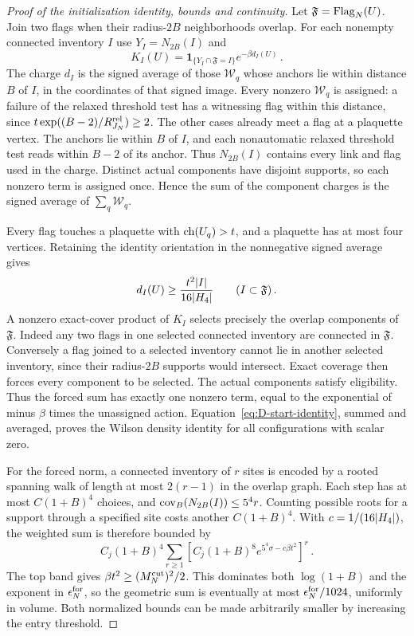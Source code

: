 \begin{proof}[Proof of the initialization identity, bounds and continuity]
Let $\mathfrak F=\operatorname{Flag}_N(U)$. Join two flags when their radius-$2B$ neighborhoods overlap. For each nonempty connected inventory $I$ use $Y_I=N_{2B}(I)$ and
\begin{equation*}
K_I(U)=\mathbf1_{\{Y_I\cap \mathfrak F=I\}}e^{-\beta d_I(U)}\,.
\end{equation*}
The charge $d_I$ is the signed average of those $\mathcal W_q$ whose anchors lie within distance $B$ of $I$, in the coordinates of that signed image. Every nonzero $\mathcal W_q$ is assigned: a failure of the relaxed threshold test has a witnessing flag within this distance, since $t\exp((B-2)/R_{J_N}^{\rm rel})\ge2$. The other cases already meet a flag at a plaquette vertex. The anchors lie within $B$ of $I$, and each nonautomatic relaxed threshold test reads within $B-2$ of its anchor. Thus $N_{2B}(I)$ contains every link and flag used in the charge. Distinct actual components have disjoint supports, so each nonzero term is assigned once. Hence the sum of the component charges is the signed average of $\sum_q\mathcal W_q$.

Every flag touches a plaquette with $\operatorname{ch}(U_q)>t$, and a plaquette has at most four vertices. Retaining the identity orientation in the nonnegative signed average gives
\begin{equation*}
d_I(U)\ge\frac{t^2|I|}{16|H_4|}\qquad(I\subset \mathfrak F)\,.
\end{equation*}
A nonzero exact-cover product of $K_I$ selects precisely the overlap components of $\mathfrak F$. Indeed any two flags in one selected connected inventory are connected in $\mathfrak F$. Conversely a flag joined to a selected inventory cannot lie in another selected inventory, since their radius-$2B$ supports would intersect. Exact coverage then forces every component to be selected. The actual components satisfy eligibility. Thus the forced sum has exactly one nonzero term, equal to the exponential of minus $\beta$ times the unassigned action. Equation~\eqref{eq:D-start-identity}, summed and averaged, proves the Wilson density identity for all configurations with scalar zero.

For the forced norm, a connected inventory of $r$ sites is encoded by a rooted spanning walk of length at most $2(r-1)$ in the overlap graph. Each step has at most $C(1+B)^4$ choices, and $\operatorname{cov}_B(N_{2B}(I))\le5^4r$. Counting possible roots for a support through a specified site costs another $C(1+B)^4$. With $c=1/(16|H_4|)$, the weighted sum is therefore bounded by
\begin{equation*}
C_j(1+B)^4\sum_{r\ge1}
\left[C_j(1+B)^8e^{5^4\sigma-c\beta t^2}\right]^r\,.
\end{equation*}
The top band gives $\beta t^2\ge(M^{\mathrm{cut}}_N)^2/2$. This dominates both $\log(1+B)$ and the exponent in $\epsilon_N^{\rm for}$, so the geometric sum is eventually at most $\epsilon_N^{\rm for}/1024$, uniformly in volume. Both normalized bounds can be made arbitrarily smaller by increasing the entry threshold.


\end{proof}
